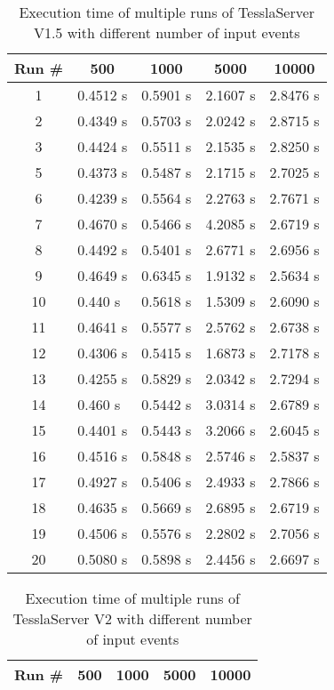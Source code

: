 \begin{table}[!htb]
  \centering
  \caption{Execution time of multiple runs of TesslaServer V1.5 with different number of input events}
  \label{table:tessla_server_v1_5_events_num_events_data}
  \begin{tabular}{cllll}
    Run \# & \multicolumn{1}{c}{500} & \multicolumn{1}{c}{1000} & \multicolumn{1}{c}{5000} & \multicolumn{1}{c}{10000} \\ \hline
   1 &   0.4512 s & 0.5901 s & 2.1607 s & 2.8476 s \\
   2 &   0.4349 s & 0.5703 s & 2.0242 s & 2.8715 s \\
   3 &   0.4424 s & 0.5511 s & 2.1535 s & 2.8250 s \\
   5 &   0.4373 s & 0.5487 s & 2.1715 s & 2.7025 s \\
   6 &   0.4239 s & 0.5564 s & 2.2763 s & 2.7671 s \\
   7 &   0.4670 s & 0.5466 s & 4.2085 s & 2.6719 s \\
   8 &   0.4492 s & 0.5401 s & 2.6771 s & 2.6956 s \\
   9 &   0.4649 s & 0.6345 s & 1.9132 s & 2.5634 s \\
   10 &  0.440 s  & 0.5618 s & 1.5309 s & 2.6090 s \\
   11 &  0.4641 s & 0.5577 s & 2.5762 s & 2.6738 s \\
   12 &  0.4306 s & 0.5415 s & 1.6873 s & 2.7178 s \\
   13 &  0.4255 s & 0.5829 s & 2.0342 s & 2.7294 s \\
   14 &  0.460 s  & 0.5442 s & 3.0314 s & 2.6789 s \\
   15 &  0.4401 s & 0.5443 s & 3.2066 s & 2.6045 s \\
   16 &  0.4516 s & 0.5848 s & 2.5746 s & 2.5837 s \\
   17 &  0.4927 s & 0.5406 s & 2.4933 s & 2.7866 s \\
   18 &  0.4635 s & 0.5669 s & 2.6895 s & 2.6719 s \\
   19 &  0.4506 s & 0.5576 s & 2.2802 s & 2.7056 s \\
   20 &  0.5080 s & 0.5898 s & 2.4456 s & 2.6697 s
  \end{tabular}
\end{table}

\begin{table}[!htb]
  \centering
  \caption{Execution time of multiple runs of TesslaServer V2 with different number of input events}
  \label{table:tessla_server_v2_events_num_events_data}
  \begin{tabular}{cllll}
    Run \# & \multicolumn{1}{c}{500} & \multicolumn{1}{c}{1000} & \multicolumn{1}{c}{5000} & \multicolumn{1}{c}{10000} \\ \hline
  \end{tabular}
\end{table}

